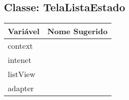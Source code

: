 \documentclass[12pt]{article}
\begin{document}
	\subsection{Classe: TelaListaEstado}
		\begin{table}[H]
			\begin{center}
				\begin{tabular}{l | l}
					\toprule
						Variável & Nome Sugerido\\
					\midrule
						context & \\
						intenet & \\
						listView & \\
						adapter & \\
					\bottomrule
				\end{tabular}
			\end{center}
		\end{table}
\end{document}
